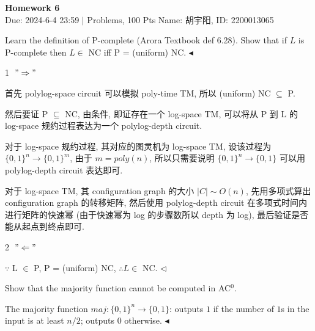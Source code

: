 \documentclass[11pt]{article}
\newenvironment{problem}[2][Problem]{\begin{trivlist}
		\item[\hskip \labelsep {\bfseries #1}\hskip \labelsep {\bfseries #2.}]}{\hfill$\blacktriangleleft$\end{trivlist}}
\newenvironment{answer}[1][Answer]{\begin{trivlist}
		\item[\hskip \labelsep {\bfseries #1.}\hskip \labelsep]}{\hfill$\lhd$\end{trivlist}}
\begin{document}
	\pagestyle{fancy}
	\chead{}
	\begin{center}
		{\LARGE \bf Homework 6}\\
		{Due: 2024-6-4 23:59 \quad$|$ Problems, 100 Pts}
		{Name: 胡宇阳, ID: 2200013065}
	\end{center}
	\begin{problem}{1.(12分)}
		Learn the definition of P-complete (Arora Textbook def 6.28). Show that if $L$ is P-complete then $L \in $ NC iff P = (uniform) NC.
	\end{problem}
	\begin{answer}
		\textcircled{1} $"\Rightarrow"$
		
		首先 polylog-space circuit 可以模拟 poly-time TM, 所以 (uniform) NC $\subseteq$ P.
		
		然后要证 P $\subseteq$ NC, 由条件, 即证存在一个 log-space TM, 可以将从 P 到 L 的 log-space 规约过程表达为一个 polylog-depth circuit. 
		
		对于 log-space 规约过程, 其对应的图灵机为 log-space TM, 设该过程为 $\{0,1\}^n\rightarrow\{0,1\}^m$, 由于 $m=poly(n)$, 所以只需要说明 $\{0,1\}^n\rightarrow\{0,1\}$ 可以用 polylog-depth circuit 表达即可.
		
		对于 log-space TM, 其 configuration graph 的大小 $|C|\sim O(n)$, 先用多项式算出 configuration graph 的转移矩阵, 然后使用 polylog-depth circuit 在多项式时间内进行矩阵的快速幂 (由于快速幂为 log 的步骤数所以 depth 为 log), 最后验证是否能从起点到终点即可. 
		
		\textcircled{2} $"\Leftarrow"$
		
		$\because$ L $\in$ P, P = (uniform) NC, $\therefore L\in$ NC.
	\end{answer}
	\begin{problem}{2.(24分)}
		Show that the majority function cannot be computed in AC$^0$.
		
		The majority function $maj : \{0, 1\}^n\rightarrow\{0, 1\}$: outputs $1$ if the number of $1$s in the input is at least $n/2$; outputs $0$ otherwise.
	\end{problem}
\end{document}
